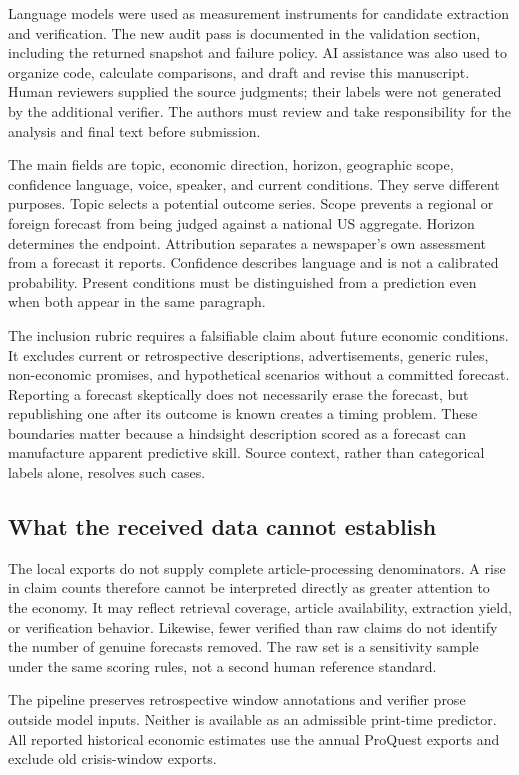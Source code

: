 \documentclass[iicol,pdflatex,sn-mathphys-num]{sn-jnl}
\begin{document}
Language models were used as measurement instruments for candidate extraction and verification. The new audit pass is documented in the validation section, including the returned snapshot and failure policy. AI assistance was also used to organize code, calculate comparisons, and draft and revise this manuscript. Human reviewers supplied the source judgments; their labels were not generated by the additional verifier. The authors must review and take responsibility for the analysis and final text before submission.

The main fields are topic, economic direction, horizon, geographic scope, confidence language, voice, speaker, and current conditions. They serve different purposes. Topic selects a potential outcome series. Scope prevents a regional or foreign forecast from being judged against a national US aggregate. Horizon determines the endpoint. Attribution separates a newspaper's own assessment from a forecast it reports. Confidence describes language and is not a calibrated probability. Present conditions must be distinguished from a prediction even when both appear in the same paragraph.

The inclusion rubric requires a falsifiable claim about future economic conditions. It excludes current or retrospective descriptions, advertisements, generic rules, non-economic promises, and hypothetical scenarios without a committed forecast. Reporting a forecast skeptically does not necessarily erase the forecast, but republishing one after its outcome is known creates a timing problem. These boundaries matter because a hindsight description scored as a forecast can manufacture apparent predictive skill. Source context, rather than categorical labels alone, resolves such cases.

\subsection{What the received data cannot establish}
The local exports do not supply complete article-processing denominators. A rise in claim counts therefore cannot be interpreted directly as greater attention to the economy. It may reflect retrieval coverage, article availability, extraction yield, or verification behavior. Likewise, fewer verified than raw claims do not identify the number of genuine forecasts removed. The raw set is a sensitivity sample under the same scoring rules, not a second human reference standard.

The pipeline preserves retrospective window annotations and verifier prose outside model inputs. Neither is available as an admissible print-time predictor. All reported historical economic estimates use the annual ProQuest exports and exclude old crisis-window exports.
\end{document}
